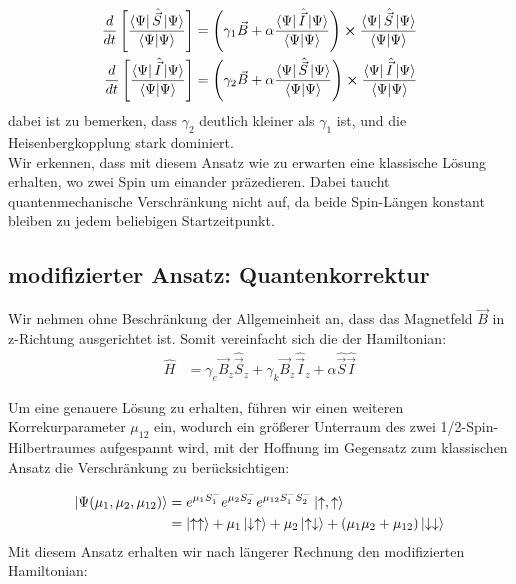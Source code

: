 \documentclass[12pt]{article}
\def\N{\bra{\Psi}\ket{\Psi}}
\begin{document}
\begin{align}
    \frac{d}{dt}\left[\frac{\bra{\Psi}\hat{\vec{S}}\ket{\Psi}}{\N}\right] &= \left(\gamma_1\vec{B} + \alpha \frac{\bra{\Psi}\hat{\vec{I}}\ket{\Psi}}{\N}\right)\cross\frac{\bra{\Psi}\hat{\vec{S}}\ket{\Psi}}{\N}\\
    \frac{d}{dt}\left[\frac{\bra{\Psi}\hat{\vec{I}}\ket{\Psi}}{\N}\right] &= \left(\gamma_2\vec{B} + \alpha \frac{\bra{\Psi}\hat{\vec{S}}\ket{\Psi}}{\N}\right)\cross\frac{\bra{\Psi}\hat{\vec{I}}\ket{\Psi}}{\N}
\end{align}
\noindent dabei ist zu bemerken, dass $\gamma_2$ deutlich kleiner als $\gamma_1$ ist, und die Heisenbergkopplung stark dominiert.\\
Wir erkennen, dass mit diesem Ansatz wie zu erwarten eine klassische Lösung erhalten, wo zwei Spin um einander präzedieren. Dabei 
taucht quantenmechanische Verschränkung nicht auf, da beide Spin-Längen konstant bleiben zu jedem beliebigen Startzeitpunkt.





















\subsection{modifizierter Ansatz: Quantenkorrektur}

\noindent Wir nehmen ohne Beschränkung der Allgemeinheit an, dass das Magnetfeld $\vec{B}$ in z-Richtung ausgerichtet ist. Somit vereinfacht sich die der Hamiltonian:
\begin{align}
    \hat{H} &= \gamma_e \vec{B}_z\hat{\vec{S}}_z +  \gamma_k\vec{B}_z\hat{\vec{I}}_z + \alpha \hat{\vec{S}}\hat{\vec{I}}
\end{align}


\noindent Um eine genauere Lösung zu erhalten, führen wir einen weiteren Korrekurparameter $\mu_{12}$ ein, wodurch ein größerer Unterraum des zwei 1/2-Spin-Hilbertraumes aufgespannt wird, mit der Hoffnung im Gegensatz zum klassischen Ansatz die Verschränkung zu berücksichtigen:


\begin{align}
    \ket{\Psi(\mu_1,\mu_2,\mu_{12})} &= e^{\mu_1 S_1^-}e^{\mu_2 S_2^-}e^{\mu_{12} S_1^-S_2^-}\ket{\uparrow,\uparrow}\\
                                    &= \ket{\uparrow \uparrow} +\mu_1\ket{\downarrow \uparrow} + \mu_2\ket{\uparrow \downarrow} + (\mu_1\mu_2 + \mu_{12})\ket{\downarrow \downarrow}
\end{align}
Mit diesem Ansatz erhalten wir nach längerer Rechnung den modifizierten Hamiltonian:
\end{document}
